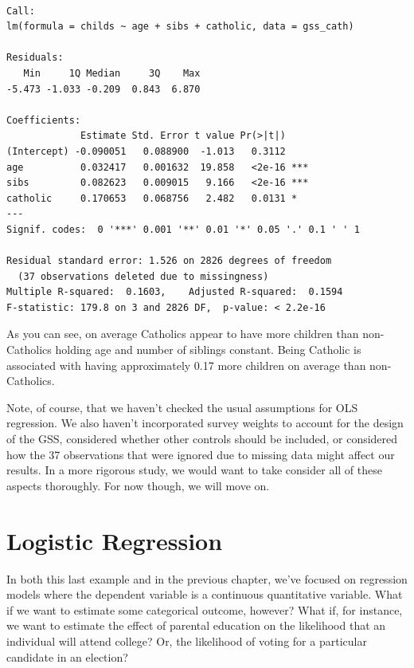 \documentclass[
  letterpaper,
]{book}
\begin{document}
\begin{verbatim}

Call:
lm(formula = childs ~ age + sibs + catholic, data = gss_cath)

Residuals:
   Min     1Q Median     3Q    Max 
-5.473 -1.033 -0.209  0.843  6.870 

Coefficients:
             Estimate Std. Error t value Pr(>|t|)    
(Intercept) -0.090051   0.088900  -1.013   0.3112    
age          0.032417   0.001632  19.858   <2e-16 ***
sibs         0.082623   0.009015   9.166   <2e-16 ***
catholic     0.170653   0.068756   2.482   0.0131 *  
---
Signif. codes:  0 '***' 0.001 '**' 0.01 '*' 0.05 '.' 0.1 ' ' 1

Residual standard error: 1.526 on 2826 degrees of freedom
  (37 observations deleted due to missingness)
Multiple R-squared:  0.1603,    Adjusted R-squared:  0.1594 
F-statistic: 179.8 on 3 and 2826 DF,  p-value: < 2.2e-16
\end{verbatim}

As you can see, on average Catholics appear to have more children than
non-Catholics holding age and number of siblings constant. Being
Catholic is associated with having approximately 0.17 more children on
average than non-Catholics.

Note, of course, that we haven't checked the usual assumptions for OLS
regression. We also haven't incorporated survey weights to account for
the design of the GSS, considered whether other controls should be
included, or considered how the 37 observations that were ignored due to
missing data might affect our results. In a more rigorous study, we
would want to take consider all of these aspects thoroughly. For now
though, we will move on.

\hypertarget{logistic-regression}{%
\section{Logistic Regression}\label{logistic-regression}}

In both this last example and in the previous chapter, we've focused on
regression models where the dependent variable is a continuous
quantitative variable. What if we want to estimate some categorical
outcome, however? What if, for instance, we want to estimate the effect
of parental education on the likelihood that an individual will attend
college? Or, the likelihood of voting for a particular candidate in an
election?
\end{document}
